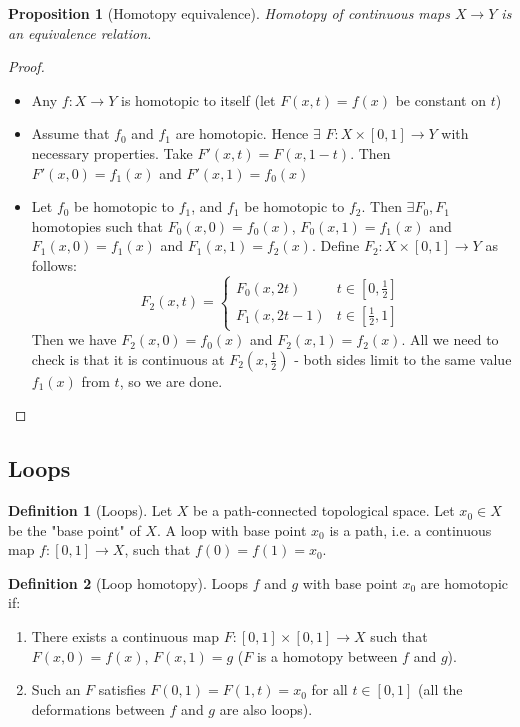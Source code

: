\documentclass{article}
\theoremstyle{definition}
\newtheorem{defn}{Definition}[section]
\theoremstyle{plain}%
\newtheorem{prop}[thm]{Proposition}
\theoremstyle{remark}
\begin{document}
\begin{prop}[Homotopy equivalence]
    Homotopy of continuous maps $X \to Y$ is an equivalence relation.
\end{prop}

\begin{proof}
     \begin{itemize}
         \item Any $f : X \to Y$ is homotopic to itself (let $F(x,t) = f(x)$ be constant on $t$)
         \item Assume that $f_0$ and $f_1$ are homotopic. Hence $\exists$ $F : X \times [0,1] \to Y$ with necessary properties. Take $F'(x,t) = F(x, 1-t)$. Then $F'(x,0) = f_1(x)$ and $F'(x,1) = f_0(x)$
         \item Let $f_0$ be homotopic to $f_1$, and $f_1$ be homotopic to $f_2$. Then $\exists F_0, F_1$ homotopies such that $F_0(x,0) = f_0(x)$, $F_0(x, 1) = f_1(x)$ and $F_1(x,0) = f_1(x)$ and $F_1(x,1) = f_2(x)$. Define $F_2: X \times [0,1] \to Y$ as follows:
         \[F_2(x,t) = \begin{cases} F_0(x,2t) &t \in [0, \frac{1}{2}]  \\ F_1(x, 2t-1) &t \in [\frac{1}{2}, 1] \end{cases}\]
         Then we have $F_2(x,0) = f_0(x)$ and $F_2(x,1) = f_2(x)$. All we need to check is that it is continuous at $F_2(x, \frac{1}{2})$ - both sides limit to the same value $f_1(x)$ from $t$, so we are done.
     \end{itemize}
\end{proof}

\subsection{Loops}

\begin{defn}[Loops]
    Let $X$ be a path-connected topological space. Let $x_0 \in X$ be the "base point" of $X$. A loop with base point $x_0$ is a path, i.e. a continuous map $f: [0,1] \to X$, such that $f(0) = f(1) = x_0$.
\end{defn}

\begin{defn}[Loop homotopy]
    Loops $f$ and $g$ with base point $x_0$ are homotopic if:
    \begin{enumerate}
        \item There exists a continuous map $F : [0,1] \times [0,1] \to X$ such that $F(x,0) = f(x)$, $F(x,1) = g$ ($F$ is a homotopy between $f$ and $g$).
        \item Such an $F$ satisfies $F(0,1) = F(1,t) = x_0$ for all $t \in [0,1]$ (all the deformations between $f$ and $g$ are also loops).
    \end{enumerate}
\end{defn}
\end{document}
